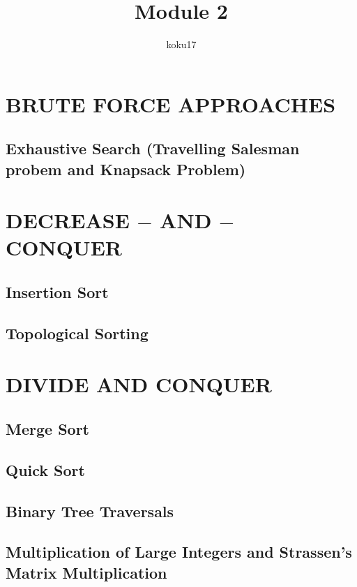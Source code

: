 \documentclass{article}
\author{koku17}
\title{Module 2}
\begin{document}
	\maketitle \thispagestyle{empty} \newpage
	\tableofcontents \thispagestyle{empty} \newpage \setcounter{page}{1}
	\section{BRUTE FORCE APPROACHES}
	\subsection{Exhaustive Search (Travelling Salesman probem and Knapsack Problem)}

	\section{DECREASE $-$ AND $-$ CONQUER}
	\subsection{Insertion Sort}
	\subsection{Topological Sorting}

	\section{DIVIDE AND CONQUER}
	\subsection{Merge Sort}
	\subsection{Quick Sort}
	\subsection{Binary Tree Traversals}
	\subsection{Multiplication of Large Integers and Strassen's Matrix Multiplication}
\end{document}
